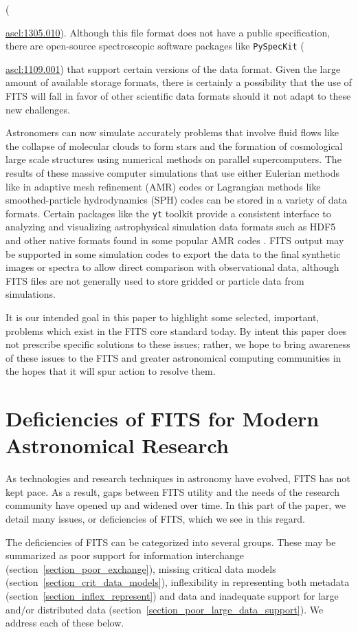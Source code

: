 \documentclass[final,authoryear,5p,times,twocolumn]{elsarticle}
\begin{document}
({\href{http://ascl.net/1305.010}{ascl:1305.010}). Although this file
format does not have a public specification,  there are open-source
spectroscopic software packages like \texttt{PySpecKit}
({\href{http://ascl.net/1109.001}{ascl:1109.001}) that support certain
versions of the data format.  Given the large amount of available
storage formats, there is certainly a possibility that the use of FITS
will fall in favor of other scientific data formats should it not adapt
to these new challenges.


Astronomers can now simulate accurately problems that involve fluid
flows like the collapse of molecular clouds to form stars and the
formation of cosmological large scale structures using numerical methods
on parallel supercomputers.  The results of these massive computer
simulations that use either Eulerian methods like in adaptive mesh
refinement (AMR) codes or Lagrangian methods like smoothed-particle
hydrodynamics (SPH) codes can be stored in a variety of data formats.
Certain packages like the \texttt{yt} toolkit provide a consistent
interface to analyzing and visualizing astrophysical simulation data
formats such as HDF5 and other native formats found in some popular AMR
codes \citep{2011ApJS..192....9T}. FITS output may be supported in some
simulation codes to export the data to the final synthetic images or
spectra to allow direct comparison with observational data, although
FITS files are not generally used to store gridded or particle data from
simulations.


It is our intended goal in this paper to highlight some selected,
important, problems which exist in the FITS core standard today.
By intent this paper does not prescribe specific solutions to these issues;
rather, we hope to bring awareness of these issues to the FITS and greater
astronomical computing communities in the hopes that
it will spur action to resolve them.

\section{Deficiencies of FITS for Modern Astronomical Research}

As technologies and research techniques in astronomy have evolved, FITS
has not kept pace. As a result, gaps between FITS utility and the
needs of the research community have opened up and widened over time. In
this part of the paper, we detail many issues, or deficiencies of FITS,
which we see in this regard.


The deficiencies of FITS can be categorized into several groups.
These may be summarized as poor support for information
interchange (section~\ref{section_poor_exchange}),
missing critical data models (section~\ref{section_crit_data_models}), inflexibility in
representing both metadata (section~\ref{section_inflex_represent}) and data and inadequate
support for large and/or distributed data (section~\ref{section_poor_large_data_support}). We address each of these below.

}}
\end{document}
